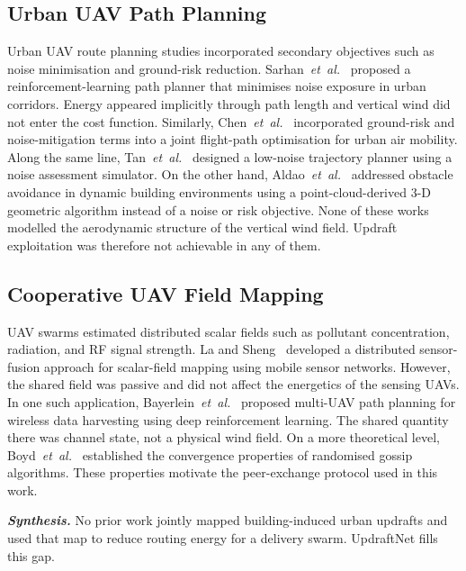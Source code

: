 \documentclass[conference]{IEEEtran}
\newcommand{\rd}[1]{#1}   %
\begin{document}
\subsection{Urban UAV Path Planning}

Urban UAV route planning studies incorporated secondary
objectives such as noise minimisation and ground-risk reduction. Sarhan~\textit{et~al.}~\cite{sarhan} proposed a reinforcement-learning path
planner that minimises noise exposure in urban corridors.
Energy appeared implicitly through path length and vertical
wind did not enter the cost function. Similarly, Chen~\textit{et~al.}~\cite{chen}
incorporated ground-risk and noise-mitigation terms into a
joint flight-path optimisation for urban air mobility. Along
the same line, Tan~\textit{et~al.}~\cite{tan} designed a low-noise trajectory
planner using a noise assessment simulator. On the other hand,
Aldao~\textit{et~al.}~\cite{aldao} addressed obstacle avoidance in dynamic
building environments using a point-cloud-derived 3-D geometric algorithm instead of a noise or risk objective. None of
these works modelled the aerodynamic structure of the vertical
wind field. Updraft exploitation was therefore not achievable
in any of them.

\subsection{Cooperative UAV Field Mapping}

UAV swarms estimated distributed scalar fields such as
pollutant concentration, radiation, and RF signal strength. La
and Sheng~\cite{la} developed a distributed sensor-fusion approach for
scalar-field mapping using mobile sensor networks. However, the shared field was passive and did not affect the
energetics of the sensing UAVs. In one such application,
Bayerlein~\textit{et~al.}~\cite{bayerlein} proposed multi-UAV path planning for
wireless data harvesting using deep reinforcement learning.
The shared quantity there was channel state, not a physical
wind field. On a more theoretical level, Boyd~\textit{et~al.}~\cite{boyd} established the
convergence properties of randomised gossip algorithms. These properties \rd{motivate} the
\rd{peer-exchange} protocol used in this work.

\textit{\textbf{Synthesis.}}
No prior work jointly mapped building-induced urban updrafts and
used that map to reduce routing energy for a delivery swarm.
UpdraftNet fills this gap.

\end{document}
